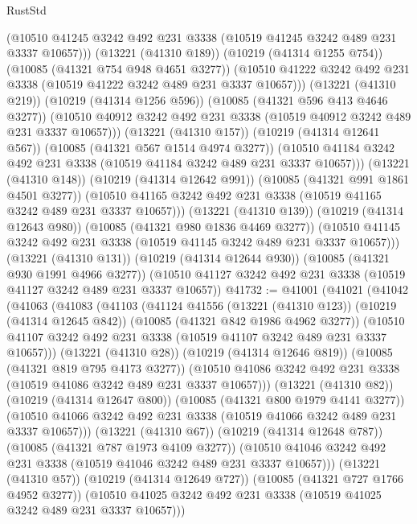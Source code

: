 \begin{lexlean}{RustStd}
\begin{coremodule}
                (@10510 @41245 @3242 @492 @231 @3338 (@10519 @41245 @3242 @489 @231 @3337 @10657)))
              (@13221 (@41310 @189))
              (@10219 (@41314 @1255 @754))
              (@10085 (@41321 @754 @948 @4651 @3277))
              (@10510 @41222 @3242 @492 @231 @3338 (@10519 @41222 @3242 @489 @231 @3337 @10657)))
            (@13221 (@41310 @219))
            (@10219 (@41314 @1256 @596))
            (@10085 (@41321 @596 @413 @4646 @3277))
            (@10510 @40912 @3242 @492 @231 @3338 (@10519 @40912 @3242 @489 @231 @3337 @10657)))
          (@13221 (@41310 @157))
          (@10219 (@41314 @12641 @567))
          (@10085 (@41321 @567 @1514 @4974 @3277))
          (@10510 @41184 @3242 @492 @231 @3338 (@10519 @41184 @3242 @489 @231 @3337 @10657)))
        (@13221 (@41310 @148))
        (@10219 (@41314 @12642 @991))
        (@10085 (@41321 @991 @1861 @4501 @3277))
        (@10510 @41165 @3242 @492 @231 @3338 (@10519 @41165 @3242 @489 @231 @3337 @10657)))
      (@13221 (@41310 @139))
      (@10219 (@41314 @12643 @980))
      (@10085 (@41321 @980 @1836 @4469 @3277))
      (@10510 @41145 @3242 @492 @231 @3338 (@10519 @41145 @3242 @489 @231 @3337 @10657)))
    (@13221 (@41310 @131))
    (@10219 (@41314 @12644 @930))
    (@10085 (@41321 @930 @1991 @4966 @3277))
    (@10510 @41127 @3242 @492 @231 @3338 (@10519 @41127 @3242 @489 @231 @3337 @10657))
@41732 := @41001
    (@41021
      (@41042
        (@41063
          (@41083
            (@41103
              (@41124
                @41556
                (@13221 (@41310 @123))
                (@10219 (@41314 @12645 @842))
                (@10085 (@41321 @842 @1986 @4962 @3277))
                (@10510 @41107 @3242 @492 @231 @3338 (@10519 @41107 @3242 @489 @231 @3337 @10657)))
              (@13221 (@41310 @28))
              (@10219 (@41314 @12646 @819))
              (@10085 (@41321 @819 @795 @4173 @3277))
              (@10510 @41086 @3242 @492 @231 @3338 (@10519 @41086 @3242 @489 @231 @3337 @10657)))
            (@13221 (@41310 @82))
            (@10219 (@41314 @12647 @800))
            (@10085 (@41321 @800 @1979 @4141 @3277))
            (@10510 @41066 @3242 @492 @231 @3338 (@10519 @41066 @3242 @489 @231 @3337 @10657)))
          (@13221 (@41310 @67))
          (@10219 (@41314 @12648 @787))
          (@10085 (@41321 @787 @1973 @4109 @3277))
          (@10510 @41046 @3242 @492 @231 @3338 (@10519 @41046 @3242 @489 @231 @3337 @10657)))
        (@13221 (@41310 @57))
        (@10219 (@41314 @12649 @727))
        (@10085 (@41321 @727 @1766 @4952 @3277))
        (@10510 @41025 @3242 @492 @231 @3338 (@10519 @41025 @3242 @489 @231 @3337 @10657)))

\end{coremodule}
\end{lexlean}
